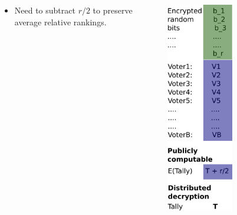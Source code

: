 \documentclass[10pt,xcolor=svgnames,169]{beamer} %
\begin{document}
\begin{frame}
\begin{columns}
\begin{column}{0.7\textwidth}
\begin{itemize}
\item Need to subtract $r/2$ to preserve average relative rankings.
	\end{itemize}
		\end{column}
\begin{column}{0.3\textwidth}  %
\begin{center}
	\includegraphics[width=0.5\textwidth]{homomorphicAddition_addBits}
\end{center}
\end{column}
\end{columns}

\end{frame}
\end{document}
